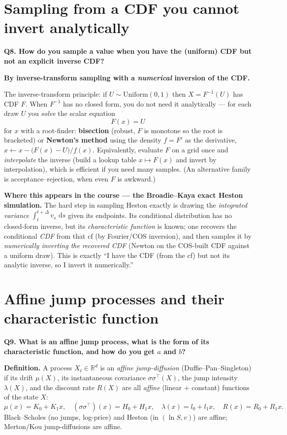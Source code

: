 \documentclass[11pt]{article}
\newcommand{\R}{\mathbb{R}}
\newcommand{\dd}{\,\mathrm{d}}
\newcommand{\Qhead}[1]{\bigskip\noindent\textbf{\large #1}\par\nobreak\smallskip}
\begin{document}
\section{Sampling from a CDF you cannot invert analytically}
\Qhead{Q8. How do you sample a value when you have the (uniform) CDF but not an explicit inverse CDF?}
\textbf{By inverse-transform sampling with a \emph{numerical} inversion of the CDF.}

The inverse-transform principle: if $U\sim\mathrm{Uniform}(0,1)$ then $X=F^{-1}(U)$ has CDF $F$. When $F^{-1}$
has no closed form, you do not need it analytically --- for each draw $U$ you \emph{solve} the scalar equation
\begin{equation}
F(x)=U
\end{equation}
for $x$ with a root-finder: \textbf{bisection} (robust, $F$ is monotone so the root is bracketed) or
\textbf{Newton's method} using the density $f=F'$ as the derivative,
$x\leftarrow x-\big(F(x)-U\big)/f(x)$. Equivalently, evaluate $F$ on a grid once and \emph{interpolate} the
inverse (build a lookup table $x\mapsto F(x)$ and invert by interpolation), which is efficient if you need many
samples. (An alternative family is acceptance--rejection, when even $F$ is awkward.)

\textbf{Where this appears in the course --- the Broadie--Kaya exact Heston simulation.} The hard step in
sampling Heston exactly is drawing the \emph{integrated variance} $\int_t^{t+\Delta}v_s\,\dd s$ given its
endpoints. Its conditional distribution has no closed-form inverse, but its \emph{characteristic function} is
known; one recovers the conditional \emph{CDF} from that cf (by Fourier/COS inversion), and then samples it by
\emph{numerically inverting the recovered CDF} (Newton on the COS-built CDF against a uniform draw). This is
exactly ``I have the CDF (from the cf) but not its analytic inverse, so I invert it numerically.''

\section{Affine jump processes and their characteristic function}
\Qhead{Q9. What is an affine jump process, what is the form of its characteristic function, and how do you get $a$ and $b$?}
\textbf{Definition.} A process $X_t\in\R^d$ is an \emph{affine jump-diffusion} (Duffie--Pan--Singleton) if its
drift $\mu(X)$, its instantaneous covariance $\sigma\sigma^{\!\top}(X)$, the jump intensity $\lambda(X)$, and
the discount rate $R(X)$ are all \emph{affine} (linear $+$ constant) functions of the state $X$:
\[
\mu(x)=K_0+K_1x,\quad (\sigma\sigma^{\!\top})(x)=H_0+H_1x,\quad \lambda(x)=l_0+l_1x,\quad R(x)=R_0+R_1x .
\]
Black--Scholes (no jumps, log-price) and Heston (in $(\ln S,v)$) are affine; Merton/Kou jump-diffusions are
affine.
\end{document}
